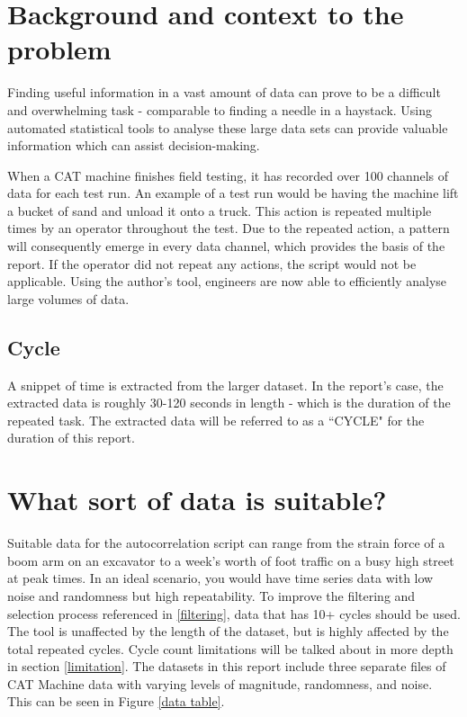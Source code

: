 \raggedright
\section{Background and context to the problem}
Finding useful information in a vast amount of data can prove to be a difficult and overwhelming task - comparable to finding a needle in a haystack. Using automated statistical tools to analyse these large data sets can provide valuable information which can assist decision-making. 

When a CAT machine finishes field testing, it has recorded over 100 channels of data for each test run. An example of a test run would be having the machine lift a bucket of sand and unload it onto a truck. This action is repeated multiple times by an operator throughout the test. Due to the repeated action, a pattern will consequently emerge in every data channel, which provides the basis of the report. If the operator did not repeat any actions, the script would not be applicable. Using the author's tool, engineers are now able to efficiently analyse large volumes of data. 


\subsection{Cycle}
A snippet of time is extracted from the larger dataset. In the report's case, the extracted data is roughly 30-120 seconds in length - which is the duration of the repeated task. The extracted data will be referred to as a ``CYCLE" for the duration of this report. 

\section{What sort of data is suitable?}
Suitable data for the autocorrelation script can range from the strain force of a boom arm on an excavator to a week's worth of foot traffic on a busy high street at peak times.  In an ideal scenario, you would have time series data with low noise and randomness but high repeatability. To improve the filtering and selection process referenced in \ref{filtering}, data that has 10+ cycles should be used. The tool is unaffected by the length of the dataset, but is highly affected by the total repeated cycles. Cycle count limitations will be talked about in more depth in section \ref{limitation}. The datasets in this report include three separate files of CAT Machine data with varying levels of magnitude, randomness, and noise. This can be seen in Figure \ref{data table}. 

